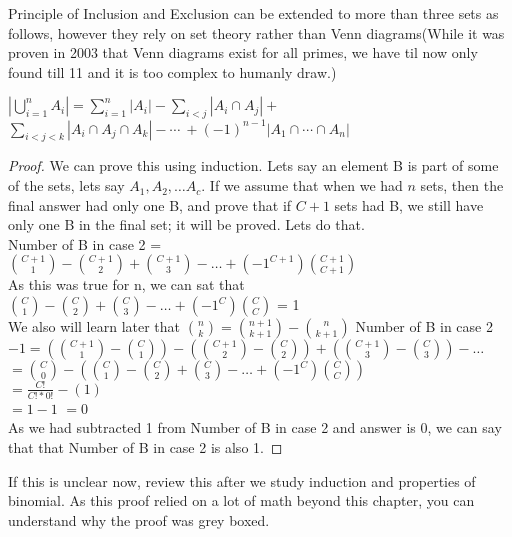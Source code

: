 \begin{mdframed}[backgroundcolor=gray!20]
Principle of Inclusion and Exclusion can be extended to more than three sets as follows, however they rely on set theory rather than Venn diagrams(While it was proven in 2003 that Venn diagrams exist for all primes, we have til now only found till 11 and it is too complex to humanly draw.)
\begin{theorem}
    $\left|\bigcup_{i=1}^n A_i\right|=\sum_{i=1}^n\left|A_i\right| -\sum_{i < j}\left|A_i\cap A_j\right| +$ \\
    $ \sum_{i<j<k}\left|A_i\cap A_j\cap A_k\right|-\cdots\ +(-1)^{n-1} \left|A_1\cap\cdots\cap A_n\right|{}$
\end{theorem}
\begin{proof}
We can prove this using induction. Lets say an element B is part of  some of the sets, lets say $A_1, A_2, \dots A_c$. If we assume that when we had $n$ sets, then the final answer had only one B, and prove that if $C+1$ sets had B, we still have only one B in the final set; it will be proved. Lets do that.\\
Number of B in case 2 = $\binom{C+1}{1} - \binom{C+1}{2} + \binom{C+1}{3} - \dots +(-1^{C+1})\binom{C+1}{C+1}$ \\
As this was true for n, we can sat that $\binom{C}{1} - \binom{C}{2} + \binom{C}{3} - \dots +(-1^{C})\binom{C}{C}$ = 1 \\
We also will learn later that $\binom{n}{k}=\binom{n+1}{k+1}-\binom{n}{k+1}$
Number of B in case 2 $- 1 = (\binom{C+1}{1}-\binom{C}{1}) - (\binom{C+1}{2}-\binom{C}{2}) + (\binom{C+1}{3}-\binom{C}{3}) - \dots$ \\
$= \binom{C}{0}-(\binom{C}{1} - \binom{C}{2} + \binom{C}{3} - \dots +(-1^{C})\binom{C}{C})$\\
$= \frac{C!}{C!*0!}-(1)$\\
$=1-1$
$=0$\\
As we had subtracted 1 from Number of B in case 2 and answer is 0, we can say that that Number of B in case 2 is also 1.
\end{proof}
If this is unclear now, review this after we study induction and properties of binomial. As this proof relied on a lot of math beyond this chapter, you can understand why the proof was grey boxed.
\end{mdframed}